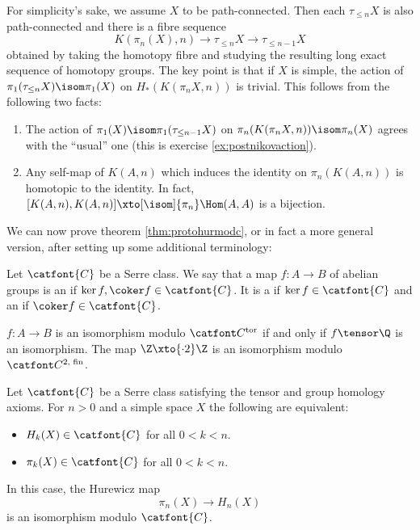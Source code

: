 For simplicity's sake, we assume $X$ to be path-connected.
Then each $\tau_{\leq n} X$ is also path-connected and there is a fibre sequence
\begin{equation*}
	K(\pi_n(X), n) \to \tau_{\leq n} X \to \tau_{\leq n - 1} X
\end{equation*}
obtained by taking the homotopy fibre and studying the resulting long exact sequence of homotopy groups.
The key point is that if $X$ is simple, the action of $\pi_1(\tau_{\leq n} X) \isom \pi_1(X)$ on $H_*(K(\pi_n X, n))$ is trivial.
This follows from the following two facts:
\begin{enumerate}
	\item The action of $\pi_1(X) \isom \pi_1(\tau_{\leq n - 1} X)$ on $\pi_n(K(\pi_n X, n)) \isom \pi_n(X)$ agrees with the \enquote{usual} one (this is exercise \ref{ex:postnikovaction}).
	\item Any self-map of $K(A, n)$ which induces the identity on $\pi_n(K(A, n))$ is homotopic to the identity.
		In fact, $[K(A, n), K(A, n)] \xto[\isom]{\pi_n} \Hom(A, A)$ is a bijection.
\end{enumerate}
We can now prove theorem \ref{thm:protohurmodc}, or in fact a more general version, after setting up some additional terminology:
\begin{definition}
	Let $\catfont{C}$ be a Serre class.
	We say that a map $f\colon A \to B$ of abelian groups is an  if $\ker f, \coker f \in \catfont{C}$.  
	It is a  if $\ker f \in \catfont{C}$ and an  if $\coker f \in \catfont{C}$.
\end{definition}
\begin{example}
	$f\colon A \to B$ is an isomorphism modulo $\Ctor$ if and only if $f \tensor \Q$ is an isomorphism.
	The map $\Z \xto{\cdot 2} \Z$ is an isomorphism modulo $\Cfinp[2]$.
\end{example}
\begin{theorem}
	Let $\catfont{C}$ be a Serre class satisfying the tensor and group homology axioms.
	For $n > 0$ and a simple space $X$ the following are equivalent:
	\begin{itemize}
		\item $H_k(X) \in \catfont{C}$ for all $0 < k < n$.
		\item $\pi_k(X) \in \catfont{C}$ for all $0 < k < n$.
	\end{itemize}
	In this case, the Hurewicz map 
	\begin{equation*}
		\pi_n(X) \to H_n(X)
	\end{equation*}
	is an isomorphism modulo $\catfont{C}$.
\end{theorem}
